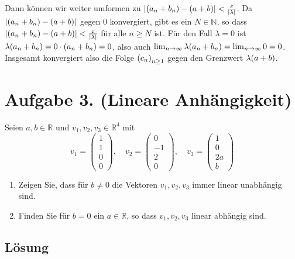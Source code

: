 \documentclass[german,12pt]{homework}
\newcommand{\NN}{\mathbb{N}}
\newcommand{\RR}{\mathbb{R}}
\DeclarePairedDelimiter{\absolute}{\lvert}{\rvert}
\DeclarePairedDelimiter{\enbrace}{(}{)}
\begin{document}
\begin{enumerate}
        Dann können wir weiter umformen zu \(\absolute*{\enbrace*{a_n + b_n} -
        \enbrace*{a + b}} < \frac{\varepsilon}{\absolute*{\lambda}}\). Da
        \(\absolute*{\enbrace*{a_n + b_n} - \enbrace*{a + b}}\) gegen \(0\)
        konvergiert, gibt es ein \(N \in \NN\), so dass
        \(\absolute*{\enbrace*{a_n + b_n} - \enbrace*{a + b}} <
        \frac{\varepsilon}{\absolute*{\lambda}}\) für alle \(n \ge N\) ist. Für
        den Fall \(\lambda = 0\) ist \(\lambda\enbrace*{a_n + b_n} = 0 \cdot
        \enbrace*{a_n + b_n} = 0\), also auch \(\lim_{n \to
        \infty}\lambda\enbrace*{a_n + b_n} = \lim_{n \to \infty}0 = 0\).
        Insgesamt konvergiert also die Folge \(\enbrace*{c_n}_{n \ge 1}\) gegen
        den Grenzwert \(\lambda\enbrace*{a + b}\).
    \end{enumerate}

    \section*{Aufgabe 3. (Lineare Anhängigkeit)}

    \begin{problem}
        Seien \(a, b \in \RR\) und \(v_1, v_2, v_3 \in \RR^4\) mit
        \[v_1 = \begin{pmatrix}1\\1\\0\\0\end{pmatrix}, \quad v_2 =
        \begin{pmatrix}0\\-1\\2\\0\end{pmatrix}, \quad v_3 =
        \begin{pmatrix}1\\0\\2a\\b\end{pmatrix}\]
        \begin{enumerate}
            \item Zeigen Sie, dass für \(b \ne 0\) die Vektoren \(v_1, v_2,
            v_3\) immer linear unabhängig sind.
            \item Finden Sie für \(b = 0\) ein \(a \in \RR\), so dass \(v_1,
            v_2, v_3\) linear abhängig sind.
        \end{enumerate}
    \end{problem}

    \subsection*{Lösung}
\end{document}
